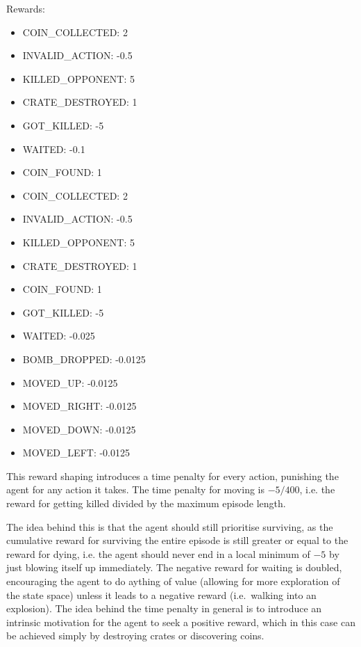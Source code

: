 \documentclass{article} %
\begin{document}
	Rewards:
	\begin{itemize}
		\item COIN\_COLLECTED: 2
		\item INVALID\_ACTION: -0.5
		\item KILLED\_OPPONENT: 5
		\item CRATE\_DESTROYED: 1
		\item GOT\_KILLED: -5
		\item WAITED: -0.1
		\item COIN\_FOUND: 1
	\end{itemize}
	
	\begin{itemize}
		\item COIN\_COLLECTED: 2
		\item INVALID\_ACTION: -0.5
		\item KILLED\_OPPONENT: 5
		\item CRATE\_DESTROYED: 1
		\item COIN\_FOUND: 1
		\item GOT\_KILLED: -5
		\item WAITED: -0.025
		\item BOMB\_DROPPED: -0.0125
		\item MOVED\_UP: -0.0125
		\item MOVED\_RIGHT: -0.0125
		\item MOVED\_DOWN: -0.0125
		\item MOVED\_LEFT: -0.0125
	\end{itemize}
	
	This reward shaping introduces a time penalty for every action, punishing the agent for any action it takes. The time penalty for moving is $-5/400$, i.e. the reward for getting killed divided by the maximum episode length.
	
	The idea behind this is that the agent should still prioritise surviving, as the cumulative reward for surviving the entire episode is still greater or equal to the reward for dying, i.e. the agent should never end in a local minimum of $-5$ by just blowing itself up immediately. 
	The negative reward for waiting is doubled, encouraging the agent to do aything of value (allowing for more exploration of the state space) unless it leads to a negative reward (i.e.\ walking into an explosion).
	The idea behind the time penalty in general is to introduce an intrinsic motivation for the agent to seek a positive reward, which in this case can be achieved simply by destroying crates or discovering coins.
	
\end{document}
